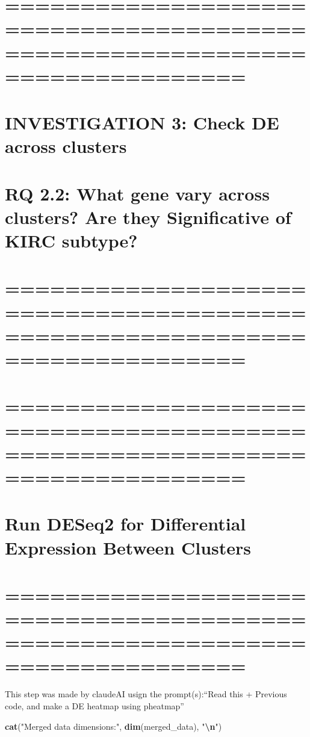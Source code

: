 \documentclass[
]{article}
\newenvironment{Shaded}{\begin{snugshade}}{\end{snugshade}}
\newcommand{\FunctionTok}[1]{\textcolor[rgb]{0.13,0.29,0.53}{\textbf{#1}}}
\newcommand{\NormalTok}[1]{#1}
\newcommand{\SpecialCharTok}[1]{\textcolor[rgb]{0.81,0.36,0.00}{\textbf{#1}}}
\newcommand{\StringTok}[1]{\textcolor[rgb]{0.31,0.60,0.02}{#1}}
\begin{document}
\section{============================================================================}\label{section-11}

\section{INVESTIGATION 3: Check DE across
clusters}\label{investigation-3-check-de-across-clusters}

\section{RQ 2.2: What gene vary across clusters? Are they Significative
of KIRC
subtype?}\label{rq-2.2-what-gene-vary-across-clusters-are-they-significative-of-kirc-subtype}

\section{============================================================================}\label{section-12}

\section{============================================================================}\label{section-13}

\section{Run DESeq2 for Differential Expression Between
Clusters}\label{run-deseq2-for-differential-expression-between-clusters}

\section{============================================================================}\label{section-14}

This step was made by claudeAI usign the prompt(s):``Read this +
Previous code, and make a DE heatmap using pheatmap''

\begin{Shaded}
\begin{Highlighting}[]
\FunctionTok{cat}\NormalTok{(}\StringTok{"Merged data dimensions:"}\NormalTok{, }\FunctionTok{dim}\NormalTok{(merged\_data), }\StringTok{"}\SpecialCharTok{\textbackslash{}n}\StringTok{"}\NormalTok{)}
\end{Highlighting}
\end{Shaded}
\end{document}
